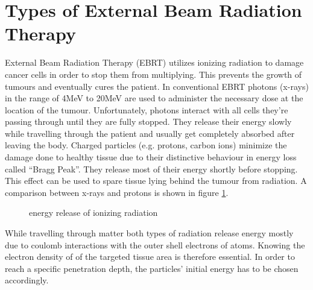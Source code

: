 \documentclass[parskip,bibtotoc,final,twoside=false,titlepage,a4paper,english,12pt,titlepage,a4paper]{scrbook}
\begin{document}
\section{Types of External Beam Radiation Therapy}
External Beam Radiation Therapy (EBRT) utilizes ionizing radiation to damage cancer cells in order to stop them from multiplying.
This prevents the growth of tumours and eventually cures the patient. 
In conventional EBRT photons (x-rays) in the range of 4MeV to 20MeV are used to administer the necessary dose at the location of the tumour. Unfortunately, photons interact with all cells
they're passing through until they are fully stopped. They release their energy slowly while travelling through the patient and usually get completely absorbed after leaving the body.
Charged particles (e.g. protons, carbon ions) minimize the damage done to healthy tissue due to their distinctive behaviour in energy loss called ``Bragg Peak''.
They release most of their energy shortly before stopping. \cite{Nakamura2010} This effect can be used to spare tissue lying behind the tumour from radiation. \cite{Paganetti2005} %
A comparison between x-rays and protons is shown in figure \ref{fig:bragg}.

\begin{figure}[!h]
\centering
{}
\caption{energy release of ionizing radiation}
\label{fig:bragg}
\end{figure}

While travelling through matter both types of radiation release energy mostly due to coulomb interactions with the outer shell electrons of atoms.
Knowing the electron density of of the targeted tissue area is therefore essential. In order to reach a specific penetration depth, the particles' initial energy has to be chosen accordingly.
\end{document}
